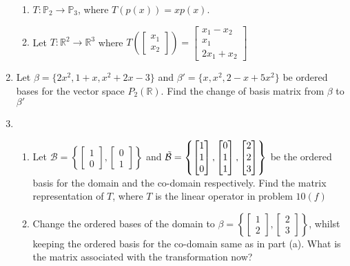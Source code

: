 \documentclass[12pt]{article}
\begin{document}
\begin{enumerate}
\begin{enumerate}
\item     $T:\mathbb{P}_2\rightarrow\mathbb{P}_3$, where $T\left(p\left(x\right)\right)=xp\left(x\right)$.

    \item Let $T:\mathbb{R}^2\rightarrow\mathbb{R}^3$ where $T\left(\begin{bmatrix}x_1\\x_2 \end{bmatrix} \right)=\begin{bmatrix} x_1-x_2\\x_1\\2x_1+x_2 \end{bmatrix} $
\end{enumerate} 


\item Let  $\beta = \{ 2x^{2}, 1 + x, x^{2} + 2x - 3\}$ and $\beta' = \{ x, x^{2}, 2-x + 5x^{2}\}$ be ordered bases for the vector space $P_{2}(\mathbb{R})$.  Find the change of basis matrix from $\beta$ to $\beta'$

\item 

\begin{enumerate}
    \item Let $\mathcal{B}=\left\{\begin{bmatrix} 1\\0 \end{bmatrix},\begin{bmatrix} 0\\1 \end{bmatrix} \right\}$ and $\Tilde{\mathcal{B}}=\left\{\begin{bmatrix} 1\\1\\0\end{bmatrix} ,\begin{bmatrix} 0\\1\\1 \end{bmatrix} ,\begin{bmatrix} 2\\2\\3 \end{bmatrix} \right\}$ be the ordered basis for the domain and the co-domain respectively. Find the matrix representation of $T$, where $T$ is the linear operator in problem $10(f)$
    

\item     Change the ordered bases of the domain to $\beta=\left\{\begin{bmatrix} 1\\2 \end{bmatrix} ,\begin{bmatrix} 2\\3 \end{bmatrix} \right\}$, whilst keeping the ordered basis for the co-domain same as in part (a). What is the matrix associated with the transformation now?
\end{enumerate}  
 





\end{enumerate}
\end{document}
